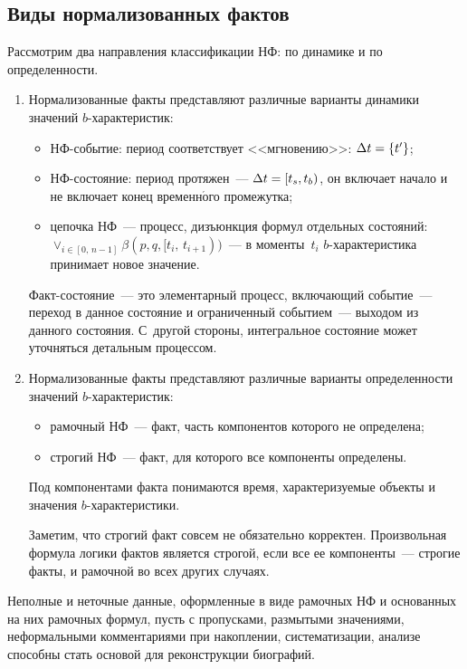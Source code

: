 \begin{multicols}{2}
\subsection{Виды нормализованных фактов}
  
  Рассмотрим два направления классификации НФ: по динамике и по 
определенности.
  \begin{enumerate}[1.]
\item Нормализованные факты представляют различные варианты динамики значений  
$b$-ха\-рак\-те\-ристик:
\begin{itemize}
\item НФ-событие: период соответствует <<мгновению>>: $\Delta 
t\hm=\{t^\prime\}$;
\item НФ-состояние: период протяжен~--- $\Delta t\hm= [t_s, t_b)$, он 
включает начало и не включает конец временн$\acute{\mbox{о}}$го промежутка;
\item цепочка НФ~--- процесс, дизъюнкция формул отдельных состояний: 
$\vee_{i\in [0,\,n-1]} \beta(p,q,[t_i,\,t_{i+1}))$~--- в моменты~$t_i$ 
$b$-характеристика принимает новое значение.
\end{itemize}

  Факт-состояние~--- это элементарный процесс, включающий событие~--- 
переход в данное состояние и ограниченный событием~--- выходом из 
данного состояния. С~другой стороны, интегральное состояние может 
уточняться детальным процессом. 
\item Нормализованные факты представляют раз\-лич\-ные варианты определенности значений\linebreak 
$b$-ха\-рак\-те\-ристик:
\begin{itemize}
\item рамочный НФ~--- факт, часть компонентов которого не определена;
\item строгий НФ~--- факт, для которого все компоненты определены.
  \end{itemize}
  
  Под компонентами факта понимаются время, характеризуемые объекты и 
значения $b$-ха\-рак\-те\-ри\-стики.
  
  Заметим, что строгий факт совсем не обязательно корректен. Произвольная 
формула логики фактов является строгой, если все ее компоненты~--- строгие 
факты, и рамочной во всех других случаях.
  \end{enumerate}
  
  Неполные и неточные данные, оформленные в виде рамочных НФ и 
основанных на них рамочных формул, пусть с пропусками, размытыми 
значениями, неформальными комментариями при накоплении, систематизации, 
анализе способны стать основой для реконструкции биографий.


\end{multicols}
